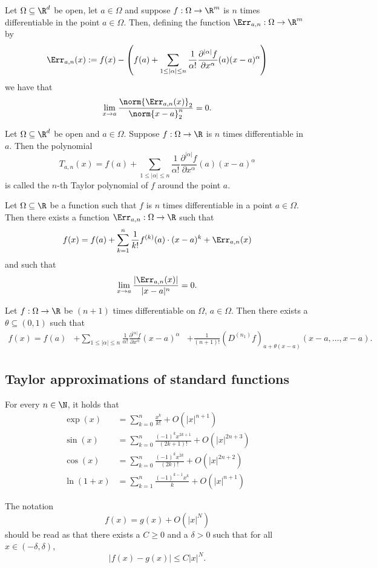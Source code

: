 \begin{theorem}
    Let $\Omega \subseteq \R^d$ be open, let $a \in \Omega$ and suppose $f:\Omega \to \R^m$ is $n$ times
    differentiable in the point $a\in\Omega$. Then, defining the function $\Err_{a,n}:\Omega \to \R^m$ by
    $$\Err_{a,n}(x):= f(x) - \left( f(a) + \sum_{1\le|\alpha|\le n}\frac{1}{\alpha!}\frac{\partial^{|\alpha|}f}{\partial x^\alpha}(a)(x-a)^\alpha\right)$$
    we have that
    $$\lim_{x \to a}\frac{\norm{\Err_{a,n}(x)}_{2}}{\norm{x-a}^n_{2}} = 0.$$
\end{theorem}

\begin{definition}
    Let $\Omega \subseteq \R^d$ be open and $a \in \Omega$. Suppose $f:\Omega\to\R$ is $n$ times differentiable
    in $a$. Then the polynomial
    $$T_{a,n}(x) = f(a) + \sum_{1\le|\alpha|\le n}\frac{1}{\alpha!}\frac{\partial^{|\alpha|}f}{\partial x^\alpha}(a)(x-a)^\alpha$$
    is called the $n$-th Taylor polynomial of $f$ around the point $a$.
\end{definition}

\begin{corollary}
    Let $\Omega \subseteq \R$ be a function such that $f$ is $n$ times differentiable in a point $a \in \Omega$.
    Then there exists a function $\Err_{a,n}: \Omega \to \R$ such that
    $$f(x) = f(a) + \sum_{k=1}^n\frac{1}{k!}f^{(k)}(a)\cdot(x-a)^k+\Err_{a,n}(x)$$
    and such that
    $$\lim_{x \to a}\frac{|\Err_{a,n}(x)|}{|x-a|^n} = 0.$$
\end{corollary}

\begin{theorem}
    Let $f: \Omega \to \R$ be $(n+1)$ times differentiable on $\Omega$, $a \in \Omega$. Then there
    exists a $\theta \subseteq (0,1)$ such that
    \begin{align*}
        f(x) = f(a) &+ \sum_{1\le|\alpha|\le n}\frac{1}{\alpha!}\frac{\partial^{|\alpha|} f}{\partial x^\alpha}(x-a)^\alpha
                    &+ \frac{1}{(n+1)!}(D^(n_1)f)_{a+\theta(x-a)}(x-a,\dots,x-a).
    \end{align*}
\end{theorem}

\subsection{Taylor approximations of standard functions}
\begin{corollary}
    For every $n \in \N$, it holds that
    \begin{align*}
        \exp(x) &= \sum_{k=0}^n\frac{x^k}{k!}+O(|x|^{n+1})\\
        \sin(x) &= \sum_{k=0}^n\frac{(-1)^kx^{2k+1}}{(2k+1)!}+O(|x|^{2n+3})\\
        \cos(x) &= \sum_{k=0}^n\frac{(-1)^kx^{2k}}{(2k)!}+O(|x|^{2n+2})\\
        \ln(1+x) &= \sum_{k=1}^n\frac{(-1)^{k-1}x^k}{k}+O(|x|^{n+1})
    \end{align*}
\end{corollary}

The notation
$$f(x) = g(x) + O(|x|^N)$$
should be read as that there exists a $C \ge 0$ and a $\delta > 0$ such that for all $x \in (-\delta,\delta)$,
$$|f(x) - g(x)| \le C|x|^N.$$
